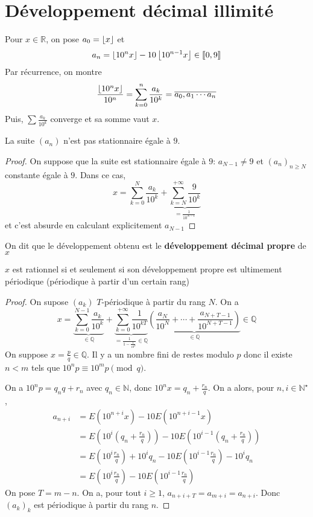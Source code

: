 \section{Développement décimal illimité}

Pour $x\in\mathbb R$, on pose $a_0=\left\lfloor x\right\rfloor$ et \[
    a_n=\left\lfloor10^nx\right\rfloor-10\left\lfloor10^{n-1}x\right\rfloor\in\llbracket 0,9\rrbracket
\]
Par récurrence, on montre \[
    \frac{\left\lfloor10^nx\right\rfloor}{10^n}=\sum_{k=0}^n\frac{a_k}{10^k}=\overline{a_0,a_1\cdots a_n}
\]
Puis, $\sum \frac{a_k}{10^k}$ converge et sa somme vaut $x$.

\begin{rem}
    La suite $(a_n)$ n'est pas stationnaire égale à $9$.
\end{rem}

\begin{proof}
    On suppose que la suite est stationnaire égale à $9$: $a_{N-1}\neq 9$ et $(a_n)_{n\geq N}$ constante égale à $9$. Dans ce cas, \[
        x=\sum_{k=0}^N\frac{a_k}{10^k}+\underbrace{\sum_{k=N}^{+\infty}\frac9{10^k}}_{=\frac1{10^{N-1}}}
    \]
    et c'est absurde en calculant explicitement $a_{N-1}$
\end{proof}

On dit que le développement obtenu est le \textbf{développement décimal propre} de $x$ 

\begin{prop}
    $x$ est rationnel si et seulement si son développement propre est ultimement périodique (périodique à partir d'un certain rang)
\end{prop}

\begin{proof}
    On supose $(a_k)$ $T$-périodique à partir du rang $N$. On a \[
        x=\underbrace{\sum_{k=0}^{N-1}\frac{a_k}{10^k}}_{\in\mathbb Q}+\underbrace{\sum_{k=0}^{+\infty}\frac1{10^{kT}}}_{=\frac1{1-\frac1{10^T}}\in\mathbb Q} \underbrace{\left(  \frac{a_N}{10^N}+\cdots +\frac{a_{N+T-1}}{10^{N+T-1}}\right)}_{\in \mathbb Q}\in\mathbb Q
    \]
    On suppose $x=\frac pq\in\mathbb Q$. Il y a un nombre fini de restes modulo $p$ donc il existe $n<m$ tels que $10^np\equiv 10^mp\pmod q$.

On a $10^np=q_nq+r_n$ avec $q_n\in\mathbb N$, donc $10^nx=q_n+\frac{r_n}q$. On a alors, pour $n, i\in\mathbb N^\star$, \begin{align*}
                a_{n+i} &= E(10^{n+i}x)-10E(10^{n+i-1}x) \\
                        &= E\left(10^i \left( q_n+\frac{r_n}q \right)\right)-10E \left( 10^{i-1} \left(  q_n+\frac{r_n}q \right) \right) \\
                        &= E \left( 10^i\frac {r_n}q \right)+10^iq_n-10E \left( 10^{i-1}\frac {r_n}q \right) -10^iq_n \\
                        &= E \left( 10^i\frac {r_n}q \right) - 10E \left( 10^{i-1}\frac {r_n}q \right)
            \end{align*}
         On pose $T=m-n$. On a, pour tout $i\geq 1$, $a_{n+i+T}=a_{m+i}=a_{n+i}$. Donc $(a_k)_k$ est périodique à partir du rang $n$.
\end{proof}

\endchapter
